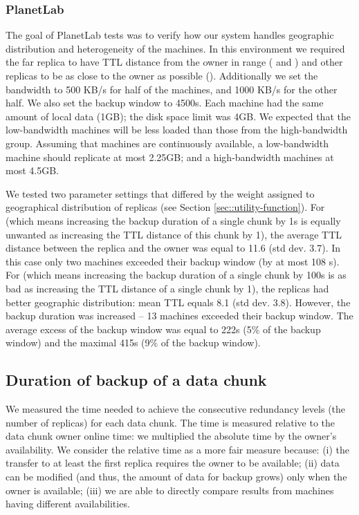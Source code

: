 \documentclass[10pt, final, conference, letterpaper]{IEEEtran}
\begin{document}
\subsubsection{PlanetLab}
The goal of PlanetLab tests was to verify how our system handles geographic distribution and heterogeneity of the machines.
In this environment we required the far replica to have TTL distance from the owner in range  ( and ) and other replicas to be as close to the owner as possible (). 
Additionally we set the bandwidth  to 500 KB/s for half of the machines, and 1000 KB/s for the other half. We also set the backup window  to 4500s. 
Each machine had the same amount of local data (1GB); the disk space limit was 4GB.
We expected that the low-bandwidth machines will be less loaded than those from the high-bandwidth group. Assuming that machines are continuously available, a low-bandwidth machine should replicate at most 2.25GB; and a high-bandwidth machines at most 4.5GB.

We tested two parameter settings that differed by the weight assigned to geographical distribution of replicas (see Section \ref{sec::utility-function}). For  (which means increasing the backup duration of a single chunk by 1s is equally unwanted as increasing the TTL distance of this chunk by 1), the average TTL distance between the replica and the owner was equal to 11.6 (std dev. 3.7). In this case only two machines exceeded their backup window (by at most 108 s). For  (which means increasing the backup duration of a single chunk by 100s is as bad as increasing the TTL distance of a single chunk by 1), the replicas had better geographic distribution: mean TTL equals 8.1 (std dev. 3.8). However, the backup duration was increased -- 13 machines exceeded their backup window. The average excess of the backup window was equal to 222s (5\% of the backup window) and the maximal 415s (9\% of the backup window).

\subsection{Duration of backup of a data chunk}
We measured the time needed to achieve the consecutive redundancy levels (the number of replicas) for each data chunk. The time is measured relative to the data chunk owner online time: we multiplied the absolute time by the owner's availability. We consider the relative time as a more fair measure because: (i) the transfer to at least the first replica requires the owner to be available; (ii) data can be modified (and thus, the amount of data for backup grows) only when the owner is available; (iii) we are able to directly compare results from machines having different availabilities.
\end{document}
